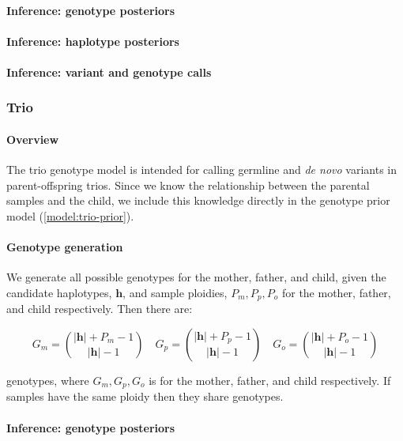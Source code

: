 \documentclass{article}
\begin{document}
\paragraph{Inference: genotype posteriors}
\paragraph{Inference: haplotype posteriors}
\paragraph{Inference: variant and genotype calls}

\subsubsection{Trio}

\paragraph{Overview}

The trio genotype model is intended for calling germline and \textit{de novo} variants in parent-offspring trios. Since we know the relationship between the parental samples and the child, we include this knowledge directly in the genotype prior model (\ref{model:trio-prior}).

\paragraph{Genotype generation}

We generate all possible genotypes for the mother, father, and child, given the candidate haplotypes, $\boldsymbol{h}$, and sample ploidies, $P_m, P_p, P_o$ for the mother, father, and child respectively. Then there are:

\begin{equation}
G_m = \binom{|\boldsymbol{h}| + P_m - 1}{|\boldsymbol{h}| - 1} \quad G_p = \binom{|\boldsymbol{h}| + P_p - 1}{|\boldsymbol{h}| - 1} \quad G_o = \binom{|\boldsymbol{h}| + P_o - 1}{|\boldsymbol{h}| - 1}
\end{equation}

genotypes, where $G_m, G_p, G_o$ is for the mother, father, and child respectively. If samples have the same ploidy then they share genotypes.

\paragraph{Inference: genotype posteriors}
\end{document}
